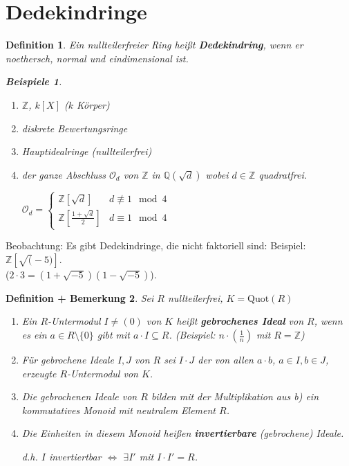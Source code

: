 \documentclass[a4paper,12pt]{scrbook}
\theoremstyle{break}
\newtheorem{Def}{Definition}[chapter]
\newtheorem{DefBem}[Def]{Definition + Bemerkung}
\theoremstyle{nonumberbreak}
\newtheorem{nnBsp}{Beispiele}
\theoremstyle{nonumberplain}
\newcommand{\emp}[1]{\textbf{\emph{#1}}}
\begin{document}
\section{Dedekindringe}

\begin{Def}

Ein nullteilerfreier Ring heißt \emp{Dedekindring}, wenn er noethersch, normal und eindimensional ist.

\begin{nnBsp}
\begin{enumerate}
\item[1)] $\mathbb{Z}$, $k[X]$ ($k$ Körper)

\item[2)] diskrete Bewertungsringe

\item[3)] Hauptidealringe (nullteilerfrei)

\item[4)] der ganze Abschluss $\mathcal{O}_d$ von $\mathbb{Z}$ in $\mathbb{Q}(\sqrt{d})$ wobei $d \in \mathbb{Z}$ quadratfrei.

$\mathcal{O}_d = \begin{cases}
\mathbb{Z}[\sqrt{d}] & d \not\equiv 1 \mod 4\\
\mathbb{Z}[\frac{1+\sqrt{d}}{2}] & d \equiv 1 \mod 4
\end{cases}$

\end{enumerate}
\end{nnBsp}

\end{Def}

Beobachtung: Es gibt Dedekindringe, die nicht faktoriell sind: Beispiel: $\mathbb{Z}[\sqrt(-5)]$.\\
($2 \cdot 3 = (1 + \sqrt{-5}) (1 - \sqrt{-5})$).

\begin{DefBem}
Sei $R$ nullteilerfrei, $K = \textrm{Quot}(R)$
\begin{enumerate}
\item[a)] Ein $R$-Untermodul $I \neq (0)$ von $K$ heißt \emp{gebrochenes Ideal} von $R$, wenn es ein $a \in R \setminus \{0\}$ gibt mit $a \cdot I \subseteq R$. (Beispiel: $n \cdot (\frac{1}{n})$ mit $R = \mathbb{Z}$)

\item[b)] Für gebrochene Ideale $I,J$ von $R$ sei $I \cdot J$ der von allen $a \cdot b$, $a \in I, b \in J$, erzeugte $R$-Untermodul von $K$.

\item[c)] Die gebrochenen Ideale von $R$ bilden mit der Multiplikation aus b) ein kommutatives Monoid mit neutralem Element $R$.

\item[d)] Die Einheiten in diesem Monoid heißen \emp{invertierbare} (gebrochene) Ideale.

d.h. $I$ invertiertbar $\Leftrightarrow$ $\exists I'$ mit $I \cdot I' = R$.

\end{enumerate}
\end{DefBem}
\end{document}
